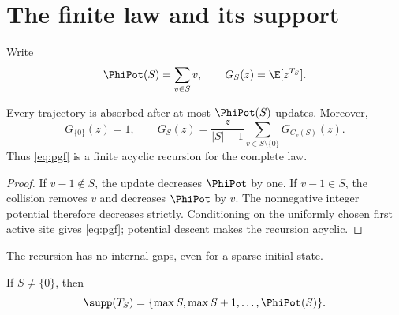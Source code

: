 \section{The finite law and its support}\label{sec:law}

Write
\[
 \PhiPot(S)=\sum_{v\in S}v,
 \qquad G_S(z)=\E[z^{T_S}].
\]

\begin{proposition}\label{prop:pgf}
Every trajectory is absorbed after at most $\PhiPot(S)$ updates.  Moreover,
\begin{equation}
 G_{\{0\}}(z)=1,
 \qquad
 G_S(z)=\frac{z}{|S|-1}
       \sum_{v\in S\setminus\{0\}}G_{C_v(S)}(z).       \label{eq:pgf}
\end{equation}
Thus \eqref{eq:pgf} is a finite acyclic recursion for the complete law.
\end{proposition}

\begin{proof}
If $v-1\notin S$, the update decreases $\PhiPot$ by one.  If
$v-1\in S$, the collision removes $v$ and decreases $\PhiPot$ by $v$.
The nonnegative integer potential therefore decreases strictly.  Conditioning
on the uniformly chosen first active site gives \eqref{eq:pgf}; potential
descent makes the recursion acyclic.
\end{proof}

The recursion has no internal gaps, even for a sparse initial state.

\begin{theorem}\label{thm:support}
If $S\ne\{0\}$, then
\begin{equation}
 \supp(T_S)=\{\max S,\max S+1,\ldots,\PhiPot(S)\}.       \label{eq:support}
\end{equation}
\end{theorem}

